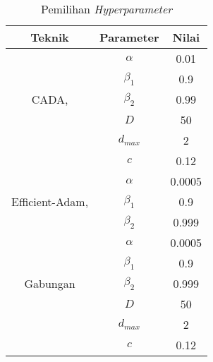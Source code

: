 \begin{table}[ht]
  \caption{Pemilihan \emph{Hyperparameter}}\label{hyperparam}
  \centering
  \begin{tabular}{ | c | c | c | }
    \hline
    \textbf{Teknik}                                               & \textbf{Parameter} & \textbf{Nilai} \\
    \hline
    \multirow{5}{*}{CADA, \textcite{Chen2021CADA}}                & $\alpha$           & 0.01           \\
                                                                  & $\beta_1$          & 0.9            \\
                                                                  & $\beta_2$          & 0.99           \\
                                                                  & $D$                & 50             \\
                                                                  & $d_{max}$          & 2              \\
                                                                  & $c$                & 0.12           \\
    \hline
    \multirow{3}{*}{Efficient-Adam, \textcite{Chen2022Efficient}} & $\alpha$           & 0.0005         \\
                                                                  & $\beta_1$          & 0.9            \\
                                                                  & $\beta_2$          & 0.999          \\
    \hline
    \multirow{5}{*}{Gabungan}                                     & $\alpha$           & 0.0005         \\
                                                                  & $\beta_1$          & 0.9            \\
                                                                  & $\beta_2$          & 0.999          \\
                                                                  & $D$                & 50             \\
                                                                  & $d_{max}$          & 2              \\
                                                                  & $c$                & 0.12           \\
    \hline
  \end{tabular}
\end{table}

